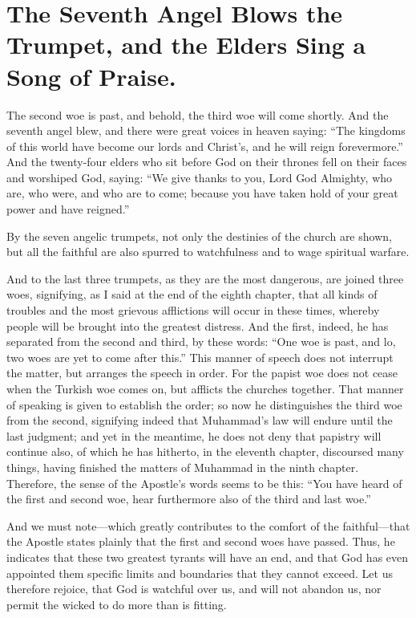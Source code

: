 \chapter[Sermon 50. The Seventh Angel Blows the Trumpet, and the Elders Sing a Song of Praise.]{The Seventh Angel Blows the Trumpet, and the Elders Sing a Song of Praise.}
\label{sermon:050}

The second woe is past, and behold, the third woe will come shortly. And the seventh angel blew, and there were great voices in heaven saying: “The kingdoms of this world have become our lords and Christ’s, and he will reign forevermore.” And the twenty-four elders who sit before God on their thrones fell on their faces and worshiped God, saying: “We give thanks to you, Lord God Almighty, who are, who were, and who are to come; because you have taken hold of your great power and have reigned.”

By the seven angelic trumpets, not only the destinies of the church are shown, but all the faithful are also spurred to watchfulness and to wage spiritual warfare.

And to the last three trumpets, as they are the most dangerous, are joined three woes, signifying, as I said at the end of the eighth chapter, that all kinds of troubles and the most grievous afflictions will occur in these times, whereby people will be brought into the greatest distress. And the first, indeed, he has separated from the second and third, by these words: “One woe is past, and lo, two woes are yet to come after this.” This manner of speech does not interrupt the matter, but arranges the speech in order. For the papist woe does not cease when the Turkish woe comes on, but afflicts the churches together. That manner of speaking is given to establish the order; so now he distinguishes the third woe from the second, signifying indeed that Muhammad’s law will endure until the last judgment; and yet in the meantime, he does not deny that papistry will continue also, of which he has hitherto, in the eleventh chapter, discoursed many things, having finished the matters of Muhammad in the ninth chapter. Therefore, the sense of the Apostle’s words seems to be this: “You have heard of the first and second woe, hear furthermore also of the third and last woe.”

And we must note—which greatly contributes to the comfort of the faithful—that the Apostle states plainly that the first and second woes have passed. Thus, he indicates that these two greatest tyrants will have an end, and that God has even appointed them specific limits and boundaries that they cannot exceed. Let us therefore rejoice, that God is watchful over us, and will not abandon us, nor permit the wicked to do more than is fitting.

